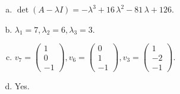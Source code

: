 \begin{questions}
\begin{solution}
\begin{enumerate}[(a)]
\item $\det(A-\lambda I)=-{\lambda}^{3} + 16 \, {\lambda}^{2} - 81 \, {\lambda} + 126$.
\item ${\lambda}_1=7, {\lambda}_2=6, {\lambda}_3=3$.
\item $v_{7}=\left(\begin{array}{r}
1 \\
0 \\
-1
\end{array}\right), v_{6}=\left(\begin{array}{r}
0 \\
1 \\
-1
\end{array}\right), v_{3}=\left(\begin{array}{r}
1 \\
-2 \\
-1
\end{array}\right)$.
\item Yes.
\end{enumerate}
\end{solution}

\end{questions}

\newpage


\begin{center}
\end{center}

